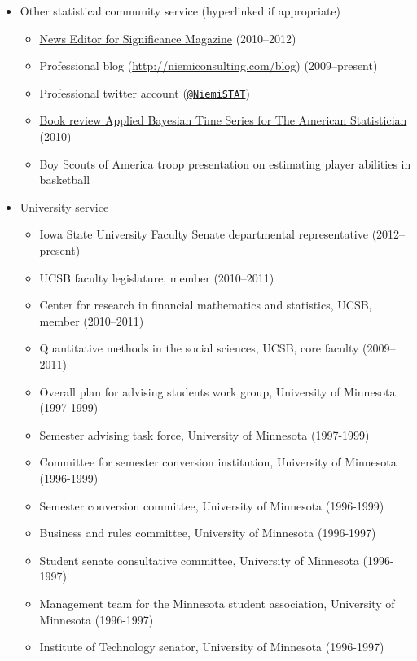 \documentclass[overlapped,line,letterpaper]{res}
\begin{document}
\begin{resume}
\begin{itemize}
\item Other statistical community service (hyperlinked if appropriate)
 \begin{itemize}
 \item \href{http://www.significancemagazine.org/view/searchResults.html?s=&t=&q=jarad+niemi}{News Editor for Significance Magazine} (2010--2012)
 \item Professional blog (\url{http://niemiconsulting.com/blog}) (2009--present)
 \item Professional twitter account ({\tt \href{https://twitter.com/NiemiSTAT}{@NiemiSTAT}})
\item \href{http://pubs.amstat.org/doi/abs/10.1198/tast.2010.br643}{Book review \underline{Applied Bayesian Time Series} for The American Statistician (2010)}
\item Boy Scouts of America troop presentation on estimating player abilities in basketball
 \end{itemize}

\item University service
 \begin{itemize}
 \item Iowa State University Faculty Senate departmental representative (2012--present)
\item UCSB faculty legislature, member (2010--2011)
\item Center for research in financial mathematics and statistics, UCSB, member (2010--2011)
\item Quantitative methods in the social sciences, UCSB, core faculty (2009--2011)
\item Overall plan for advising students work group, University of Minnesota (1997-1999)
\item Semester advising task force, University of Minnesota (1997-1999)
\item Committee for semester conversion institution, University of Minnesota (1996-1999)
\item Semester conversion committee, University of Minnesota (1996-1999)
\item Business and rules committee, University of Minnesota (1996-1997)
\item Student senate consultative committee, University of Minnesota (1996-1997)
\item Management team for the Minnesota student association, University of Minnesota (1996-1997)
\item Institute of Technology senator, University of Minnesota (1996-1997)
 \end{itemize}


\end{itemize}
\end{resume}
\end{document}
